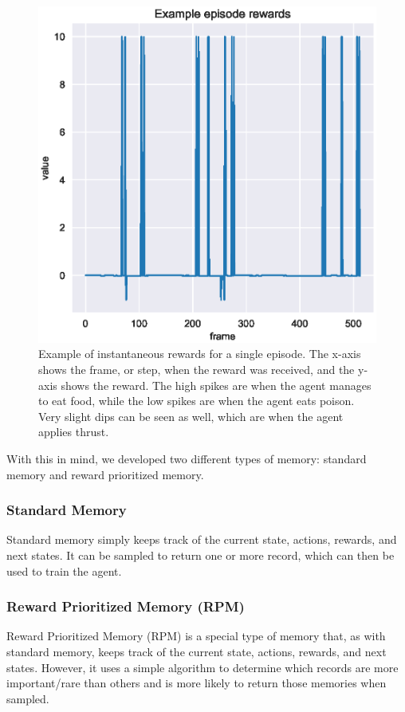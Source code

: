 \begin{figure}[htbp]
    \centering
    \includegraphics[scale=0.65]
    {./figures/example-episode-rewards}
    \caption{
        Example of instantaneous rewards for a single episode.
        The x-axis shows the frame, or step, when the reward was received, and the
        y-axis shows the reward.
        The high spikes are when the agent manages to eat food, while the low spikes
        are when the agent eats poison.
        Very slight dips can be seen as well, which are when the agent applies thrust.
    }
    \label{fig:example-episode-rewards}
\end{figure}

With this in mind, we developed two different types of memory: standard memory and
reward prioritized memory.

\subsubsection{Standard Memory}
Standard memory simply keeps track of the current state, actions, rewards, and next
states.
It can be sampled to return one or more record, which can then be used to train the
agent.

\subsubsection{Reward Prioritized Memory (RPM)}
Reward Prioritized Memory (RPM) is a special type of memory that, as with standard
memory, keeps track of the current state, actions, rewards, and next states.
However, it uses a simple algorithm to determine which records are more important/rare
than others and is more likely to return those memories when sampled.

